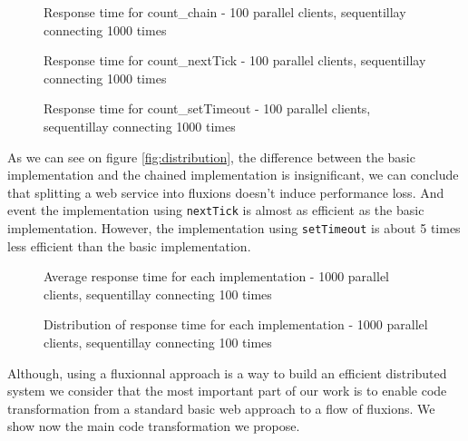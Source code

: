 \begin{figure}

\caption{Response time for count\_chain - 100 parallel clients, sequentillay connecting 1000 times}
\label{fig:timecountchain}
\end{figure}

\begin{figure}

\caption{Response time for count\_nextTick - 100 parallel clients, sequentillay connecting 1000 times}
\label{fig:timecountnextTick}
\end{figure}

\begin{figure}

\caption{Response time for count\_setTimeout - 100 parallel clients, sequentillay connecting 1000 times}
\label{fig:timecountsetTimeout}
\end{figure}

As we can see on figure \ref{fig:distribution}, the difference between the basic implementation and the chained implementation is insignificant, we can conclude that splitting a web service into fluxions doesn't induce performance loss.
And event the implementation using \texttt{nextTick} is almost as efficient as the basic implementation.
However, the implementation using \texttt{setTimeout} is about 5 times less efficient than the basic implementation.

\begin{figure}

\caption{Average response time for each implementation - 1000 parallel clients, sequentillay connecting 100 times}
\label{fig:reponsetimeparallel}
\end{figure}

\begin{figure}

\caption{Distribution of response time for each implementation - 1000 parallel clients, sequentillay connecting 100 times}
\label{fig:distributionparallel}
\end{figure}




\TODO{}
Although, using a fluxionnal approach is a way to build an efficient distributed system we consider that the most important part of our work is to enable code transformation from a standard basic web approach to a flow of fluxions.
We show now the main code transformation we propose.